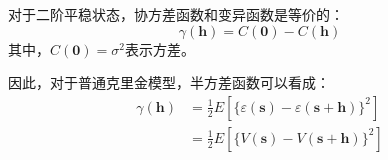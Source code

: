 对于二阶平稳状态，协方差函数和变异函数是等价的：
\begin{equation}
    \gamma \left( \mathbf{h} \right) = C \left( \mathbf{0} \right) - C \left( \mathbf{h} \right)
\end{equation}
其中，$ C \left( \mathbf{0} \right) = \sigma^{2} $表示方差。

因此，对于普通克里金模型，半方差函数可以看成：
\begin{equation}
    \begin{split}
        \gamma\left( \mathbf{h} \right)
        & = \frac{1}{2} E \left[ \{ \varepsilon\left( \mathbf{s} \right) - \varepsilon \left( \mathbf{s} + \mathbf{h} \right)\}^{2} \right] \\
        & = \frac{1}{2} E \left[ \{ V \left( \mathbf{s} \right) - V \left( \mathbf{s} + \mathbf{h} \right)\}^{2} \right]
    \end{split}
\end{equation}
